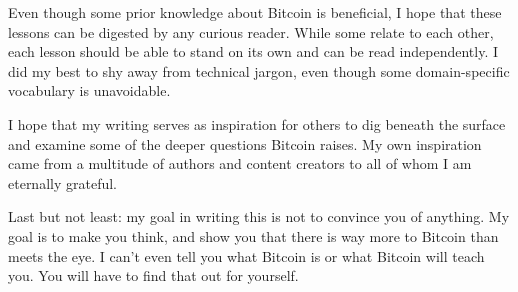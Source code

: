 Even though some prior knowledge about Bitcoin is beneficial, I hope that these
lessons can be digested by any curious reader. While some relate to each other,
each lesson should be able to stand on its own and can be read independently. I
did my best to shy away from technical jargon, even though some domain-specific
vocabulary is unavoidable.

I hope that my writing serves as inspiration for others to dig beneath the
surface and examine some of the deeper questions Bitcoin raises. My own
inspiration came from a multitude of authors and content creators to all of whom
I am eternally grateful.

Last but not least: my goal in writing this is not to convince you of anything.
My goal is to make you think, and show you that there is way more to Bitcoin
than meets the eye. I can’t even tell you what Bitcoin is or what Bitcoin will
teach you. You will have to find that out for yourself.


%
%
%
